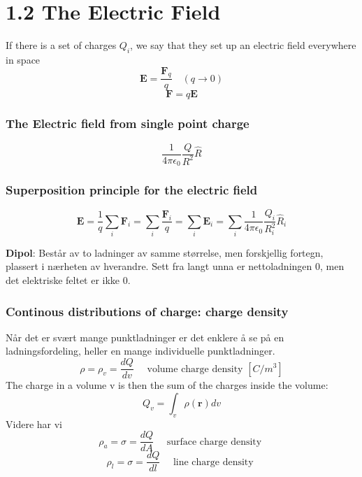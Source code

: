 \documentclass[
12pt, reprint, aip, onecolumn, notitlepage
]{revtex4-1}
\begin{document}
\section{1.2 The Electric Field}
If there is a set of charges $Q_i$, we say that they set up an electric field everywhere in space
\begin{equation}
\mathbf{E}=\frac{\mathbf{F}_{q}}{q} \quad(q \rightarrow 0) 
\end{equation}
\begin{equation}
\mathbf{F}=q \mathbf{E}
\end{equation}
\subsubsection{The Electric field from single point charge}
\begin{equation}
\frac{1}{4 \pi \epsilon_{0}} \frac{Q}{R^{2}} \hat{R}
\end{equation}

\subsubsection{Superposition principle for the electric field}
\begin{equation}
\mathbf{E}=\frac{1}{q} \sum_{i} \mathbf{F}_{i}=\sum_{i} \frac{\mathbf{F}_{i}}{q}=\sum_{i} \mathbf{E}_{i}=\sum_{i} \frac{1}{4 \pi \epsilon_{0}} \frac{Q_{i}}{R_{i}^{2}} \hat{R}_{i}
\end{equation}

\textbf{Dipol}: Består av to ladninger av samme størrelse, men forskjellig fortegn, plassert i nærheten av hverandre. Sett fra langt unna er nettoladningen 0, men det elektriske feltet er ikke 0.

\subsubsection{Continous distributions of charge: charge density}
Når det er svært mange punktladninger er det enklere å se på en ladningsfordeling, heller en mange individuelle punktladninger. 
\begin{equation}
\rho=\rho_{v}=\frac{d Q}{d v} \quad \text { volume charge density } [C/m^3]
\end{equation}
The charge in a volume v is then the sum of the charges inside the volume:
\begin{equation}
Q_{v}=\int_{v} \rho(\mathbf{r}) d v
\end{equation}
Videre har vi 
\begin{equation}
\rho_{a}=\sigma=\frac{d Q}{d A} \quad \text { surface charge density }
\end{equation}
\begin{equation}
\rho_{l}=\sigma=\frac{d Q}{d l} \quad \text { line charge density }
\end{equation}
\end{document}
